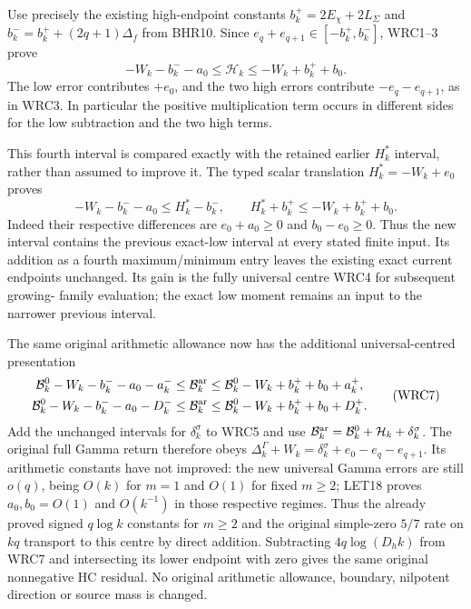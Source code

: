 \documentclass[11pt,a4paper]{article}
\begin{document}
Use precisely the existing high-endpoint constants
$b_k^+=2E_\chi+2L_\Sigma$ and
$b_k^-=b_k^++(2q+1)\Delta_f$ from BHR10.
Since $e_q+e_{q+1}\in[-b_k^+,b_k^-]$, WRC1--3 prove
\[
 -W_k-b_k^--a_0\leq\mathcal H_k
                     \leq-W_k+b_k^++b_0.
 \tag{WRC5}
\]
The low error contributes $+e_0$, and the two high errors
contribute $-e_q-e_{q+1}$, as in WRC3. In particular
the positive multiplication term occurs in different
sides for the low subtraction and the two high terms.

This fourth interval is compared exactly with the retained
earlier $H_k^*$ interval, rather than assumed to improve it.
The typed scalar translation $H_k^*=-W_k+e_0$ proves
\[
 -W_k-b_k^--a_0\leq H_k^*-b_k^-,\qquad
 H_k^*+b_k^+\leq-W_k+b_k^++b_0.
 \tag{WRC6}
\]
Indeed their respective differences are $e_0+a_0\geq0$
and $b_0-e_0\geq0$. Thus the new interval contains the
previous exact-low interval at every stated finite input.
Its addition as a fourth maximum/minimum entry leaves
the existing exact current endpoints unchanged. Its gain
is the fully universal centre WRC4 for subsequent growing-
family evaluation; the exact low moment remains an input
to the narrower previous interval.

The same original arithmetic allowance now has the
additional universal-centred presentation
\[
\begin{gathered}
 \mathcal B_k^0-W_k-b_k^--a_0-a_k^-
 \leq\mathcal B_k^{\rm ar}
 \leq\mathcal B_k^0-W_k+b_k^++b_0+a_k^+,\\
 \mathcal B_k^0-W_k-b_k^--a_0-D_k^-
 \leq\mathcal B_k^{\rm ar}
 \leq\mathcal B_k^0-W_k+b_k^++b_0+D_k^+.
\end{gathered}\tag{WRC7}
\]
Add the unchanged intervals for $\delta_k^\sigma$ to
WRC5 and use $\mathcal B_k^{\rm ar}=\mathcal B_k^0+
\mathcal H_k+\delta_k^\sigma$. The original full Gamma
return therefore obeys
$\Delta_k^\Gamma+W_k=\delta_k^\sigma+e_0-e_q-e_{q+1}$.
Its arithmetic constants have not improved: the new
universal Gamma errors are still $o(q)$, being $O(k)$
for $m=1$ and $O(1)$ for fixed $m\geq2$; LET18 proves
$a_0,b_0=O(1)$ and $O(k^{-1})$ in those respective regimes.
Thus the already proved signed $q\log k$ constants for
$m\geq2$ and the original simple-zero $5/7$ rate on
$kq$ transport to this centre by direct addition.
Subtracting $4q\log(D_hk)$ from WRC7 and intersecting
its lower endpoint with zero gives the same original
nonnegative HC residual. No original arithmetic allowance,
boundary, nilpotent direction or source mass is changed.
\end{document}
